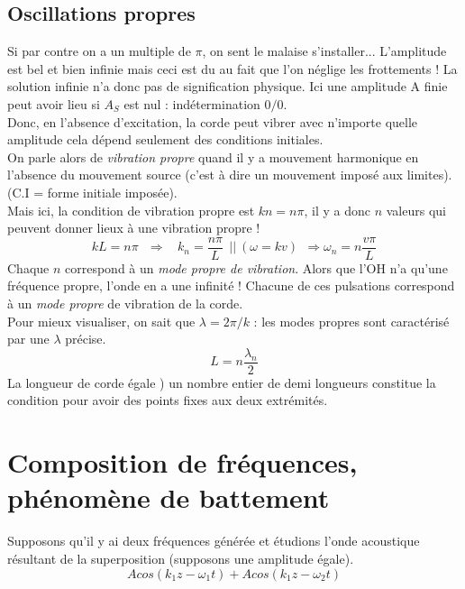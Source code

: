 \documentclass	[11pt, a4paper, openany]{book}
\begin{document}
		\subsection{Oscillations propres}
		Si par contre on a un multiple de $\pi$, on sent le malaise s'installer... L'amplitude est bel et bien infinie mais ceci est du au fait que l'on néglige les frottements ! La solution infinie n'a donc pas de signification physique. Ici une amplitude A finie peut avoir lieu si $A_S$ est nul : indétermination $0/0$.\\
		Donc, en l'absence d'excitation, la corde peut vibrer avec n'importe quelle amplitude cela dépend seulement des conditions initiales.\\
		
		On parle alors de \textit{vibration propre} quand il y a mouvement harmonique en l'absence du mouvement source (c'est à dire un mouvement imposé aux limites).(C.I =  forme initiale imposée).\\
		
		Mais ici, la condition de vibration propre est $kn = n\pi$, il y a donc $n$ valeurs qui peuvent donner lieux à une vibration propre ! 
		\begin{equation}
			kL = n\pi\ \ \ \Rightarrow\ \ \ \ k_n = \frac{n\pi}{L}\ \ ||\ (\omega = kv) \ \ \Rightarrow \omega_n = n\frac{v\pi}{L}
		\end{equation}
		Chaque $n$ correspond à un \textit{mode propre de vibration}. Alors que l'OH n'a qu'une fréquence propre, l'onde en a une infinité ! Chacune de ces pulsations correspond à un \textit{mode propre} de vibration de la corde.\\
		
		Pour mieux visualiser, on sait que $\lambda = 2\pi /k$ : les modes propres sont caractérisé par une $\lambda$ précise.
		\begin{equation}
			L = n\frac{\lambda_n}{2}
		\end{equation}
		La longueur de corde égale ) un nombre entier de demi longueurs constitue la condition pour avoir des points fixes aux deux extrémités.
		
		\section{Composition de fréquences, phénomène de battement}
		Supposons qu'il y ai  deux fréquences générée et étudions l'onde acoustique résultant de la superposition (supposons une amplitude égale).
		\begin{equation}
			Acos(k_1z - \omega_1 t) + Acos(k_1z - \omega_2 t)
		\end{equation}
\end{document}

